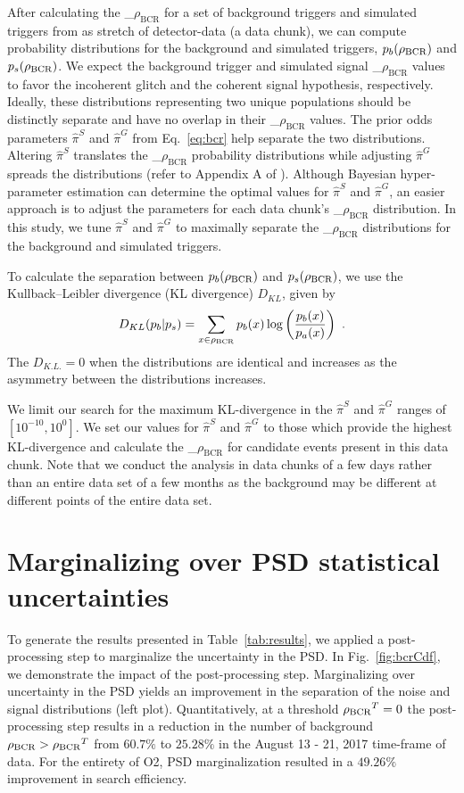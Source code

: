\documentclass[%
 nofootinbib,
 amsmath,amssymb,
 aps,
 twocolumn,
 superscriptaddress
]{revtex4-2}
\newcommand{\mathcmd}[1]{{\sc \relax\ifmmode#1\else $#1$\fi}\xspace}
\newcommand{\bcr}{\mathcmd{\rho_\text{BCR}}}
\begin{document}
After calculating the \bcr for a set of background triggers and simulated triggers from as stretch of detector-data (a data chunk), we can compute probability distributions for the background and simulated triggers, $p_b(\bcr)$ and $p_s(\bcr)$. We expect the background trigger and simulated signal \bcr values to favor the incoherent glitch and the coherent signal hypothesis, respectively. Ideally, these distributions representing two unique populations should be distinctly separate and have no overlap in their \bcr values. The prior odds parameters $\hat{\pi}^S$ and $\hat{\pi}^G$ from Eq.~\ref{eq:bcr} help separate the two distributions. Altering $\hat{\pi}^S$ translates the \bcr probability distributions while adjusting $\hat{\pi}^G$ spreads the distributions (refer to Appendix A of \citet{BCR1}). Although Bayesian hyper-parameter estimation can determine the optimal values for $\hat{\pi}^S$ and $\hat{\pi}^G$, an easier approach is to adjust the parameters for each data chunk's \bcr distribution. In this study, we tune $\hat{\pi}^S$ and $\hat{\pi}^G$ to maximally separate the \bcr distributions for the background and simulated triggers. 

To calculate the separation between $p_b(\bcr)$ and $p_s(\bcr)$, we use the Kullback--Leibler divergence (KL divergence) $D_{KL}$, given by
\begin{equation}
    D_{KL}(p_b | p_s) = \sum\limits_{x\in \bcr} p_b(x) \log \left( \frac{p_b(x)}{p_a(x)} \right)  \ .
\end{equation}
The $D_{K.L.}=0$ when the distributions are identical and increases as the asymmetry between the distributions increases. 

We limit our search for the maximum KL-divergence in the $\hat{\pi}^S$ and $\hat{\pi}^G$ ranges of $[10^{-10}, 10^0]$. We set our values for $\hat{\pi}^S$ and $\hat{\pi}^G$ to those which provide the highest KL-divergence and calculate the \bcr for candidate events present in this data chunk. Note that we conduct the analysis in data chunks of a few days rather than an entire data set of a few months as the background may be different at different points of the entire data set.

\section{Marginalizing over PSD statistical uncertainties}\label{sec:psd-marginalization}
To generate the results presented in Table~\ref{tab:results}, we applied a post-processing step to marginalize the uncertainty in the PSD. In Fig.~\ref{fig:bcrCdf}, we demonstrate the impact of the post-processing step. Marginalizing over uncertainty in the PSD yields an improvement in the separation of the noise and signal distributions (left plot). Quantitatively, at a threshold $\bcr^T=0$ the post-processing step results in a reduction in the number of background $\bcr > \bcr^T$ from $60.7\%$ to $25.28\%$ in the August 13 - 21, 2017 time-frame of data. For the entirety of O2, PSD marginalization resulted in a $49.26\%$ improvement in search efficiency. 
\end{document}

